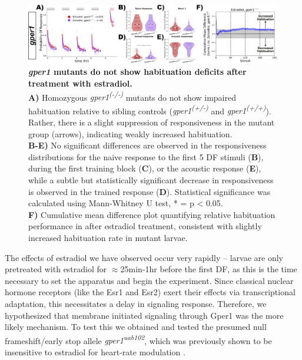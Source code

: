 \documentclass[9pt,lineno]{RandlettLab_elife}
\begin{document}
{\begin{figure}
\begin{fullwidth}
\begin{center}
\includegraphics[width=0.95\linewidth]{figures/gper1Mutants.png}
\caption{\textbf{\emph{gper1} mutants do not show habituation deficits after treatment with estradiol.}
\\ \textbf{A)} Homozygous \emph{gper1\textsuperscript{(-/-)}} mutants do not show impaired habituation relative to sibling controls (\emph{gper1\textsuperscript{(+/-)}} and \emph{gper1\textsuperscript{(+/+)}}). Rather, there is a slight suppression of responsiveness in the mutant group (arrows), indicating weakly increased habituation. 
\\ \textbf{B-E)} No significant differences are observed in the responsiveness distributions for the naive response to the first 5 DF stimuli (\textbf{B}), during the first training block (\textbf{C}), or the acoustic response (\textbf{E}), while a subtle but statistically significant decrease in responsiveness is observed in the trained response (\textbf{D}). Statistical significance was calculated using Mann-Whitney U test, * = p < 0.05.
\\ \textbf{F)} Cumulative mean difference plot quantifying relative habituation performance in  after estradiol treatment, consistent with slightly increased habituation rate in mutant larvae. 
}
\label{fig:2}

\end{center}
\end{fullwidth}
\end{figure}

The effects of estradiol we have observed occur very rapidly -- larvae are only pretreated with estradiol for $\approx$25min-1hr before the first DF, as this is the time necessary to set the apparatus and begin the experiment.
Since classical nuclear hormone receptors (like the Esr1 and Esr2) exert their effects via transcriptional adaptation, this necessitates a delay in signaling response. 
Therefore, we hypothesized that membrane initiated signaling through Gper1 was the more likely mechanism. 
To test this we obtained and tested the presumed null frameshift/early stop allele \emph{gper1\textsuperscript{uab102}}, which was previously shown to be insensitive to estradiol for heart-rate modulation \citep{Romano2017-ep}. 

}
\end{document}

